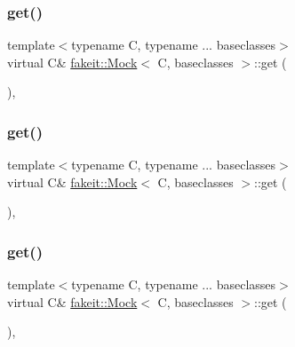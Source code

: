 \subsubsection{\texorpdfstring{get()}{get()}\hspace{0.1cm}{\footnotesize\ttfamily [1/9]}}
{\footnotesize\ttfamily template$<$typename C, typename ... baseclasses$>$ \\
virtual C\& \mbox{\hyperlink{classfakeit_1_1Mock}{fakeit\+::\+Mock}}$<$ C, baseclasses $>$\+::get (\begin{DoxyParamCaption}{ }\end{DoxyParamCaption})\hspace{0.3cm}{\ttfamily [inline]}, {\ttfamily [virtual]}}

\mbox{\label{classfakeit_1_1Mock_a139a126982e65ed43a69b21a3a8a6d35}} 
\subsubsection{\texorpdfstring{get()}{get()}\hspace{0.1cm}{\footnotesize\ttfamily [2/9]}}
{\footnotesize\ttfamily template$<$typename C, typename ... baseclasses$>$ \\
virtual C\& \mbox{\hyperlink{classfakeit_1_1Mock}{fakeit\+::\+Mock}}$<$ C, baseclasses $>$\+::get (\begin{DoxyParamCaption}{ }\end{DoxyParamCaption})\hspace{0.3cm}{\ttfamily [inline]}, {\ttfamily [virtual]}}

\mbox{\label{classfakeit_1_1Mock_a139a126982e65ed43a69b21a3a8a6d35}} 
\subsubsection{\texorpdfstring{get()}{get()}\hspace{0.1cm}{\footnotesize\ttfamily [3/9]}}
{\footnotesize\ttfamily template$<$typename C, typename ... baseclasses$>$ \\
virtual C\& \mbox{\hyperlink{classfakeit_1_1Mock}{fakeit\+::\+Mock}}$<$ C, baseclasses $>$\+::get (\begin{DoxyParamCaption}{ }\end{DoxyParamCaption})\hspace{0.3cm}{\ttfamily [inline]}, {\ttfamily [virtual]}}

